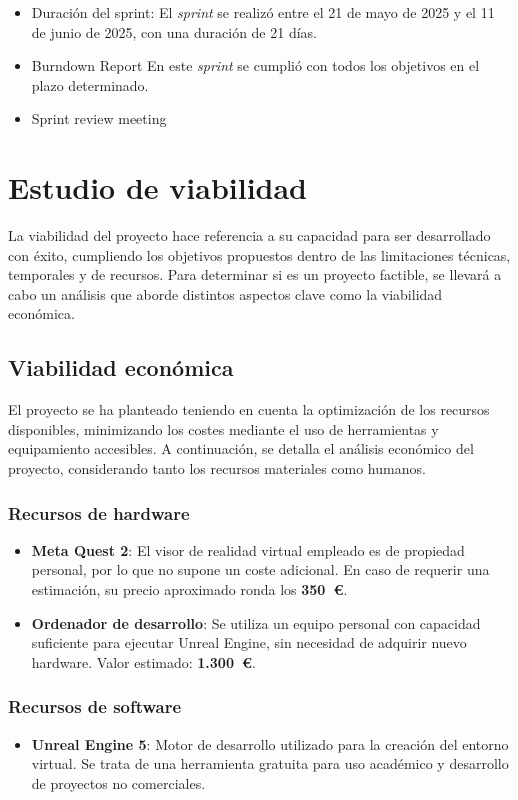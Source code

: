 \begin{itemize}
\begin{itemize}
    \item {Duración del sprint:}
El \textit{sprint } se realizó entre el 21 de mayo de 2025 y el 11 de junio de 2025, con una duración de 21 días.

    \item {Burndown Report}
En este \textit{sprint} se cumplió con todos los objetivos en el plazo determinado.

    \item {Sprint review meeting}

\end{itemize}

\section{Estudio de viabilidad}
La viabilidad del proyecto hace referencia a su capacidad para ser desarrollado con éxito, cumpliendo los objetivos propuestos dentro de las limitaciones técnicas, temporales y de recursos. Para determinar si es un proyecto factible, se llevará a cabo un análisis que aborde distintos aspectos clave como la viabilidad económica.
\subsection{Viabilidad económica}
El proyecto se ha planteado teniendo en cuenta la optimización de los recursos disponibles, minimizando los costes mediante el uso de herramientas y equipamiento accesibles. A continuación, se detalla el análisis económico del proyecto, considerando tanto los recursos materiales como humanos.

\subsubsection*{Recursos de hardware}
\begin{itemize}
  \item \textbf{Meta Quest 2}: El visor de realidad virtual empleado es de propiedad personal, por lo que no supone un coste adicional. En caso de requerir una estimación, su precio aproximado ronda los \textbf{350~€}.

  \item \textbf{Ordenador de desarrollo}: Se utiliza un equipo personal con capacidad suficiente para ejecutar Unreal Engine, sin necesidad de adquirir nuevo hardware. Valor estimado: \textbf{1.300~€}.
\end{itemize}

\subsubsection*{Recursos de software}
\begin{itemize}
  \item \textbf{Unreal Engine 5}: Motor de desarrollo utilizado para la creación del entorno virtual. Se trata de una herramienta gratuita para uso académico y desarrollo de proyectos no comerciales.


\end{itemize}
\end{itemize}
